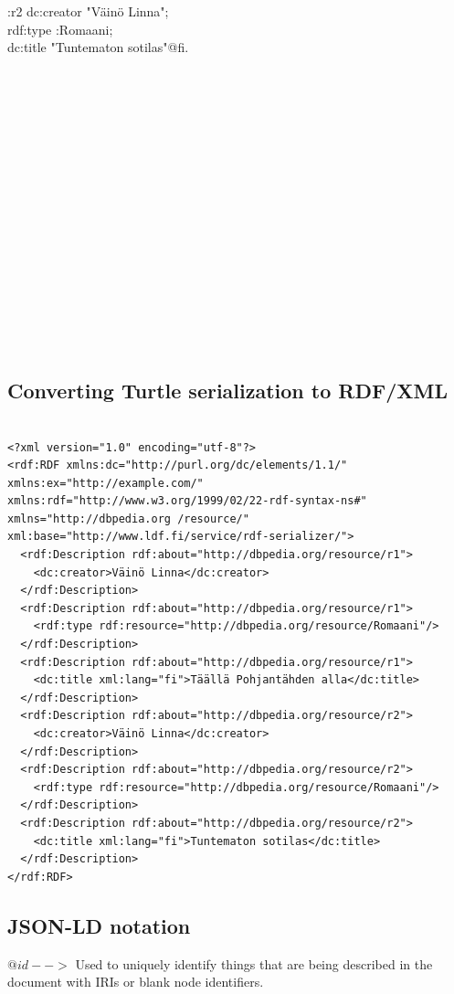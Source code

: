 \documentclass{article}
\begin{document}
:r2 dc:creator "V{\"a}inö Linna"; \\
rdf:type :Romaani; \\
dc:title "Tuntematon sotilas"@fi.\\

$ $

$ $

$ $

$ $

$ $

$ $

$ $

$ $

$ $

$ $



\subsection{Converting Turtle serialization to RDF/XML}

\begin{verbatim}

<?xml version="1.0" encoding="utf-8"?>
<rdf:RDF xmlns:dc="http://purl.org/dc/elements/1.1/" xmlns:ex="http://example.com/" xmlns:rdf="http://www.w3.org/1999/02/22-rdf-syntax-ns#" 
xmlns="http://dbpedia.org /resource/" xml:base="http://www.ldf.fi/service/rdf-serializer/">
  <rdf:Description rdf:about="http://dbpedia.org/resource/r1">
    <dc:creator>Väinö Linna</dc:creator>
  </rdf:Description>
  <rdf:Description rdf:about="http://dbpedia.org/resource/r1">
    <rdf:type rdf:resource="http://dbpedia.org/resource/Romaani"/>
  </rdf:Description>
  <rdf:Description rdf:about="http://dbpedia.org/resource/r1">
    <dc:title xml:lang="fi">Täällä Pohjantähden alla</dc:title>
  </rdf:Description>
  <rdf:Description rdf:about="http://dbpedia.org/resource/r2">
    <dc:creator>Väinö Linna</dc:creator>
  </rdf:Description>
  <rdf:Description rdf:about="http://dbpedia.org/resource/r2">
    <rdf:type rdf:resource="http://dbpedia.org/resource/Romaani"/>
  </rdf:Description>
  <rdf:Description rdf:about="http://dbpedia.org/resource/r2">
    <dc:title xml:lang="fi">Tuntematon sotilas</dc:title>
  </rdf:Description>
</rdf:RDF>

\end{verbatim}

\subsection{JSON-LD notation}

$@id -->$ Used to uniquely identify things that are being described in the document with IRIs or blank node identifiers.\\
\end{document}
